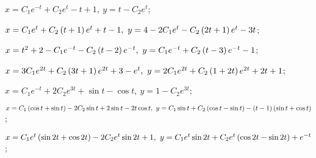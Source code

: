 	\begin{enumsolsfull}

		\label{sol:linsys_nonhmg:quasipolys}
		\item \( x = C_1 e^{-t} + C_2e^t - t + 1, ~ y = t - C_2 e^{t} \); %
		\item \( x = C_1e^{t} + C_2 \left( t+1 \right) e^{t} + t - 1 , ~ y = 4 - 2C_1 e^{t} - C_2 \left( 2t + 1 \right) e^{t} - 3t \); %
		\item \( x = t^2 + 2 - C_1e^{-t} - C_2 \left( t-2 \right) e^{-t} , ~ y = C_1e^{-t} + C_2 \left( t - 3 \right)e^{-t} - 1 \); %
		\item \( x = 3C_1e^{2t} + C_2 \left( 3t + 1 \right)e^{2t} + 3 - e^{t}, ~ y = 2C_1e^{2t} + C_2 \left( 1 + 2t \right) e^{2t} + 2t + 1 \); %
		\item \( x = C_1e^{-t} + 2C_2 e^{3t} + \sin{t} - \cos{t}, ~ y = 1 - C_2 e^{3t} \); %
		\item \( x = C_1 \left( \cos{t} + \sin{t} \right) - 2C_2 \sin{t} + 2\sin{t} - 2t \cos{t}, ~ y = C_1\sin{t} + C_2 \left( \cos{t} - \sin{t} \right) - \left( t-1 \right) \left( \sin{t} + \cos{t} \right) \); %
		\item \( x = C_1 e^{t} \left( \sin{2t} + \cos{2t} \right) - 2C_2 e^{t} \sin{2t} + 1, ~ y = C_1 e^{t} \sin{2t}  + C_2 e^{t} \left( \cos{2t} - \sin{2t} \right) + e^{-t} \); %

\end{enumsolsfull}
